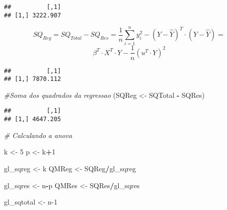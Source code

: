 \documentclass[
]{article}
\newenvironment{Shaded}{\begin{snugshade}}{\end{snugshade}}
\newcommand{\CommentTok}[1]{\textcolor[rgb]{0.56,0.35,0.01}{\textit{#1}}}
\newcommand{\DecValTok}[1]{\textcolor[rgb]{0.00,0.00,0.81}{#1}}
\newcommand{\KeywordTok}[1]{\textcolor[rgb]{0.13,0.29,0.53}{\textbf{#1}}}
\newcommand{\NormalTok}[1]{#1}
\newcommand{\OperatorTok}[1]{\textcolor[rgb]{0.81,0.36,0.00}{\textbf{#1}}}
\newcommand{\StringTok}[1]{\textcolor[rgb]{0.31,0.60,0.02}{#1}}
\begin{document}
\begin{Shaded}
\end{Shaded}

\begin{verbatim}
##          [,1]
## [1,] 3222.907
\end{verbatim}

\[SQ_{Reg} = SQ_{Total} - SQ_{Res} = \frac 1n \sum_{i=1}^n y_i^2 - (Y-\hat{Y})^T\cdot(Y-\hat{Y}) =\]
\[\beta^T \cdot X^T \cdot Y - \frac1n (u^T \cdot Y)^2\]

\begin{Shaded}
\end{Shaded}

\begin{verbatim}
##          [,1]
## [1,] 7870.112
\end{verbatim}

\begin{Shaded}
\begin{Highlighting}[]
\CommentTok{#Soma dos quadrados da regressao  }
\NormalTok{(SQReg <-}\StringTok{ }\NormalTok{SQTotal }\OperatorTok{-}\StringTok{ }\NormalTok{SQRes)}
\end{Highlighting}
\end{Shaded}

\begin{verbatim}
##          [,1]
## [1,] 4647.205
\end{verbatim}

\begin{Shaded}
\begin{Highlighting}[]
\CommentTok{# Calculando a anova}

\NormalTok{k <-}\StringTok{ }\DecValTok{5} 
\NormalTok{p <-}\StringTok{ }\NormalTok{k}\OperatorTok{+}\DecValTok{1}


\NormalTok{gl_sqreg <-}\StringTok{ }\NormalTok{k}
\NormalTok{QMReg <-}\StringTok{ }\NormalTok{SQReg}\OperatorTok{/}\NormalTok{gl_sqreg}

\NormalTok{gl_sqres <-}\StringTok{ }\NormalTok{n}\OperatorTok{-}\NormalTok{p}
\NormalTok{QMRes <-}\StringTok{ }\NormalTok{SQRes}\OperatorTok{/}\NormalTok{gl_sqres}

\NormalTok{gl_sqtotal <-}\StringTok{ }\NormalTok{n}\DecValTok{-1}
\end{Highlighting}
\end{Shaded}
\end{document}
